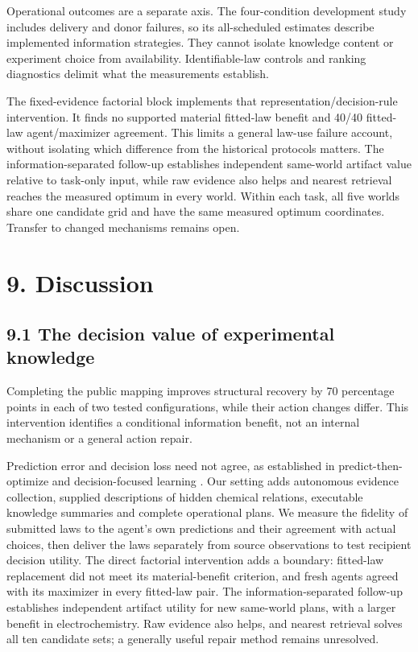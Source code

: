 \documentclass[10pt,twocolumn]{article}
\begin{document}
Operational outcomes are a separate axis. The four-condition development
study includes delivery and donor failures, so its all-scheduled
estimates describe implemented information strategies. They cannot
isolate knowledge content or experiment choice from availability.
Identifiable-law controls and ranking diagnostics delimit what the
measurements establish.

The fixed-evidence factorial block implements that
representation/decision-rule intervention. It finds no supported
material fitted-law benefit and 40/40 fitted-law agent/maximizer
agreement. This limits a general law-use failure account, without
isolating which difference from the historical protocols matters. The
information-separated follow-up establishes independent same-world
artifact value relative to task-only input, while raw evidence also
helps and nearest retrieval reaches the measured optimum in every world.
Within each task, all five worlds share one candidate grid and have the
same measured optimum coordinates. Transfer to changed mechanisms
remains open.

\section{9. Discussion}\label{discussion}

\subsection{9.1 The decision value of experimental
knowledge}\label{the-decision-value-of-experimental-knowledge}

Completing the public mapping improves structural recovery by 70
percentage points in each of two tested configurations, while their
action changes differ. This intervention identifies a conditional
information benefit, not an internal mechanism or a general action
repair.

Prediction error and decision loss need not agree, as established in
predict-then-optimize and decision-focused learning
\citep{elmachtoub2022spo, wilder2019decisionfocused}. Our setting adds
autonomous evidence collection, supplied descriptions of hidden chemical
relations, executable knowledge summaries and complete operational
plans. We measure the fidelity of submitted laws to the agent's own
predictions and their agreement with actual choices, then deliver the
laws separately from source observations to test recipient decision
utility. The direct factorial intervention adds a boundary: fitted-law
replacement did not meet its material-benefit criterion, and fresh
agents agreed with its maximizer in every fitted-law pair. The
information-separated follow-up establishes independent artifact utility
for new same-world plans, with a larger benefit in electrochemistry. Raw
evidence also helps, and nearest retrieval solves all ten candidate
sets; a generally useful repair method remains unresolved.
\end{document}

